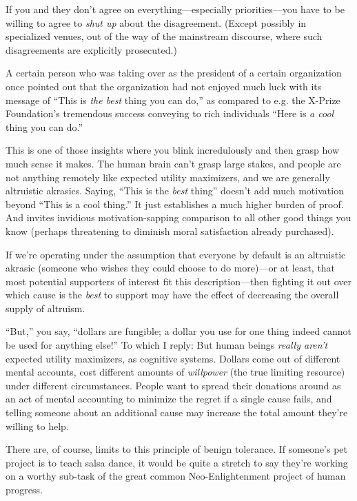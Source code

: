 {
 If you and they don't agree on
everything---especially priorities---you have to be willing to agree to
\textit{shut up} about the disagreement. (Except possibly in
specialized venues, out of the way of the mainstream discourse, where
such disagreements are explicitly prosecuted.)}

{
 A certain person who was taking over as the president of a certain
organization once pointed out that the organization had not enjoyed
much luck with its message of ``This is \textit{the
best} thing you can do,'' as compared to e.g. the
X-Prize Foundation's tremendous success conveying to
rich individuals ``Here is \textit{a cool} thing you
can do.''}

{
 This is one of those insights where you blink incredulously and
then grasp how much sense it makes. The human brain
can't grasp large stakes, and people are not anything
remotely like expected utility maximizers, and we are generally
altruistic akrasics. Saying, ``This is the
\textit{best} thing'' doesn't add
much motivation beyond ``This is a cool
thing.'' It just establishes a much higher burden of
proof. And invites invidious motivation-sapping comparison to all other
good things you know (perhaps threatening to diminish moral
satisfaction already purchased).}

{
 If we're operating under the assumption that
everyone by default is an altruistic akrasic (someone who wishes they
could choose to do more)---or at least, that most potential supporters
of interest fit this description---then fighting it out over which
cause is the \textit{best} to support may have the effect of decreasing
the overall supply of altruism.}

{
 ``But,'' you say,
``dollars are fungible; a dollar you use for one thing
indeed cannot be used for anything else!'' To which I
reply: But human beings \textit{really aren't} expected
utility maximizers, as cognitive systems. Dollars come out of different
mental accounts, cost different amounts of \textit{willpower} (the true
limiting resource) under different circumstances. People want to spread
their donations around as an act of mental accounting to minimize the
regret if a single cause fails, and telling someone about an additional
cause may increase the total amount they're willing to
help.}

{
 There are, of course, limits to this principle of benign
tolerance. If someone's pet project is to teach salsa
dance, it would be quite a stretch to say they're
working on a worthy sub-task of the great common Neo-Enlightenment
project of human progress.}

